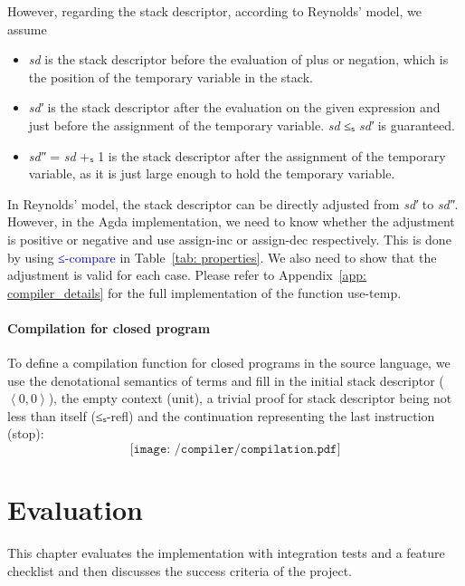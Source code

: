\documentclass[12pt,a4paper]{report}
\makeatletter
\theoremstyle{definition}
\newcommand{\mb}[1]{\textcolor{mediumblue}{#1}}
\newcommand{\mbt}[1]{\mb{\textsf{#1}}}
\newcommand{\ang}[1]{\left\langle #1 \right\rangle}
\newcommand{\chapterminitoc}{%
  \begingroup
    \let\ps@plain\ps@empty %
    \let\ps@headings\ps@empty
    \minitoc
    \thispagestyle{empty} %
    \afterpage{\clearpage} %
  \endgroup
    \clearpage
  \addtocounter{page}{-1} %
}
\makeatother
\begin{document}
        However, regarding the stack descriptor, according to Reynolds' model, we assume
        \begin{itemize}
            \item \textit{sd} is the stack descriptor before the evaluation of plus or negation, which is the position of the temporary variable in the stack.
            \item \textit{sd′} is the stack descriptor after the evaluation on the given expression and just before the assignment of the temporary variable. \textit{sd} ≤ₛ \textit{sd′} is guaranteed.
            \item \textit{sd″} = \textit{sd} +ₛ 1 is the stack descriptor after the assignment of the temporary variable, as it is just large enough to hold the temporary variable.
        \end{itemize}
        In Reynolds' model, the stack descriptor can be directly adjusted from \textit{sd′} to \textit{sd″}. However, in the Agda implementation, we need to know whether the adjustment is positive or negative and use \textsf{assign-inc} or \textsf{assign-dec} respectively. This is done by using \mbt{≤-compare} in Table~\ref{tab: properties}. We also need to show that the adjustment is valid for each case. Please refer to Appendix~\ref{app: compiler_details} for the full implementation of the function \textsf{use-temp}.
        

        \subsubsection{Compilation for closed program} \label{subsubsec: compilation}
        To define a compilation function for closed programs in the source language, we use the denotational semantics of terms and fill in the initial stack descriptor ($\ang{0, 0}$), the empty context (\textsf{unit}), a trivial proof for stack descriptor being not less than itself (\textsf{≤ₛ-refl}) and the continuation representing the last instruction (\textsf{stop}):
        \[\texttt{[image: /compiler/compilation.pdf]}\]




\chapter{Evaluation}
    \chapterminitoc
    This chapter evaluates the implementation with integration tests and a feature checklist and then discusses the success criteria of the project.
\end{document}
